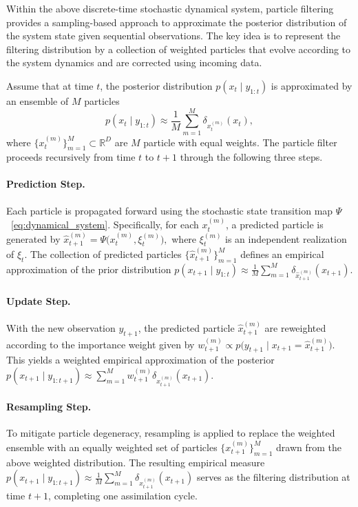 \documentclass{article}
\theoremstyle{plain}
\theoremstyle{definition}
\theoremstyle{remark}
\begin{document}
Within the above discrete-time stochastic dynamical system, particle filtering \cite{gordon1993novel,kitagawa1996monte,del1996nonlinear,johansen2009tutorial} provides a sampling-based approach to approximate the posterior distribution
of the system state given sequential observations. The key idea is to represent
the filtering distribution by a collection of weighted particles that evolve
according to the system dynamics and are corrected using incoming data.

Assume that at time $t$, the posterior distribution $p(x_t \mid y_{1:t})$ is
approximated by an ensemble of $M$ particles 
$$  
    p(x_t \mid y_{1:t}) \approx \frac{1}{M} \sum_{m=1}^M \delta_{x_t^{(m)}}(x_t),
$$ 
where $\{x_t^{(m)}\}_{m=1}^M \subset \mathbb{R}^D$ are $M$ particle with equal weights. The particle filter proceeds recursively from time $t$ to $t+1$ through the following three steps.
\vspace{-0.1in}
\paragraph{Prediction Step.}
Each particle is propagated forward using the stochastic state transition map
$\Psi$~\eqref{eq:dynamical_system}. Specifically, for each $x_t^{(m)}$, a predicted particle is generated by $\hat{x}_{t+1}^{(m)} = \Psi\bigl(x_t^{(m)}, \xi_t^{(m)}\bigr),$ where $\xi_t^{(m)}$ is an independent realization of $\xi_t$. The collection of predicted particles
$\{\hat{x}_{t+1}^{(m)}\}_{m=1}^M$ defines an empirical approximation of the prior
distribution $p(x_{t+1} \mid y_{1:t}) \approx \frac{1}{M} \sum_{m=1}^M
\delta_{\hat{x}_{t+1}^{(m)}}(x_{t+1}).$
\vspace{-0.1in}
\paragraph{Update Step.}
With the new observation $y_{t+1}$, the predicted particle $\hat{x}_{t+1}^{(m)}$ are
reweighted according to the importance weight given by $w_{t+1}^{(m)} \propto
p\bigl(y_{t+1} \mid x_{t+1} = \hat{x}_{t+1}^{(m)}\bigr).$ This yields a weighted empirical approximation of the posterior $p(x_{t+1} \mid y_{1:t+1}) \approx
\sum_{m=1}^M w_{t+1}^{(m)}
\delta_{\hat{x}_{t+1}^{(m)}}(x_{t+1}).$
\vspace{-0.1in}
\paragraph{Resampling Step.}
To mitigate particle degeneracy, resampling is applied to replace the weighted
ensemble with an equally weighted set of particles
$\{x_{t+1}^{(m)}\}_{m=1}^M$ drawn from the above weighted distribution. The resulting
empirical measure $p(x_{t+1} \mid y_{1:t+1}) \approx
\frac{1}{M} \sum_{m=1}^M \delta_{x_{t+1}^{(m)}}(x_{t+1})$ serves as the filtering distribution at time $t+1$, completing one assimilation
cycle. 
\end{document}
